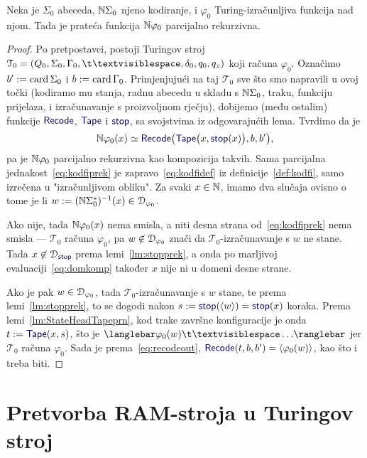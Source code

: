 \begin{teorem}\label{tm:tikp}
Neka je $\Sigma_0$ abeceda, ${\mathbb N}\Sigma_0$ njeno kodiranje, i $\varphi_0$ Turing-izračunljiva funkcija nad njom. Tada je prateća funkcija ${\mathbb N}\varphi_0$ parcijalno rekurzivna.
\end{teorem}
\begin{proof}
Po pretpostavci, postoji Turingov stroj $\mathcal T_0=(Q_0,\Sigma_0,\Gamma_0,\bl,\delta_0,q_0,q_z)$ koji računa $\varphi_0$. Označimo $b':=\operatorname{card}\Sigma_0$ i $b:=\operatorname{card}\Gamma_0$. Primjenjujući na taj $\mathcal T_0$ sve što smo napravili u ovoj točki (kodiramo mu stanja, radnu abecedu u skladu s ${\mathbb N}\Sigma_0$, traku, funkciju prijelaza, i izračunavanje s proizvoljnom rječju), dobijemo (među ostalim) funkcije $\f{Recode}$, $\f{Tape}$ i $\f{stop}$, sa svojstvima iz odgovarajućih lema. Tvrdimo da je
\begin{equation}\label{eq:kodfiprek}
    \N\varphi_0(x)\simeq
    \f{Recode}\bigl(\f{Tape}\bigl(x,\f{stop}(x)\bigr),b,b'\bigr)\text,
\end{equation}
pa je ${\mathbb N}\varphi_0$ parcijalno rekurzivna kao kompozicija takvih. Sama parcijalna jednakost~\eqref{eq:kodfiprek} je zapravo~\eqref{eq:kodfidef} iz definicije~\ref{def:kodfi}, samo izrečena u "izračunljivom obliku". Za svaki $x\in{\mathbb N}$, imamo dva slučaja ovisno o tome je li $w:=({\mathbb N}\Sigma_0^*)^{-1}(x)\in\mathcal D_{\varphi_0}$.

Ako nije, tada ${\mathbb N}\varphi_0(x)$ nema smisla, a niti desna strana od~\eqref{eq:kodfiprek} nema smisla --- $\mathcal T_0$ računa $\varphi_0$, pa $w\not\in\mathcal D_{\varphi_0}$ znači da $\mathcal T_0$-izračunavanje s $w$ ne stane. Tada $x\not\in\dom{\f{stop}}$ prema lemi~\ref{lm:stopprek}, a onda po marljivoj evaluaciji~\eqref{eq:domkomp} također $x$ nije ni u domeni desne strane.

Ako je pak $w\in\mathcal D_{\varphi_0}$, tada $\mathcal T_0$-izračunavanje s $w$ stane, te prema lemi~\ref{lm:stopprek}, to se dogodi nakon $s:=\f{stop}(\kr w)=\f{stop}(x)$ koraka. Prema lemi~\ref{lm:StateHeadTapeprn}, kod trake završne konfiguracije je onda $t:=\f{Tape}(x,s)$, što je $\knk{\varphi_0(w)\bl\ldots}$ jer $\mathcal T_0$ računa $\varphi_0$. Sada je prema~\eqref{eq:recodeout}, $\f{Recode}(t,b,b')=\kr{\varphi_0(w)}$, kao što i treba biti.
\end{proof}

\section{Pretvorba RAM-stroja u Turingov stroj}\label{sec:RAM>Turing}


